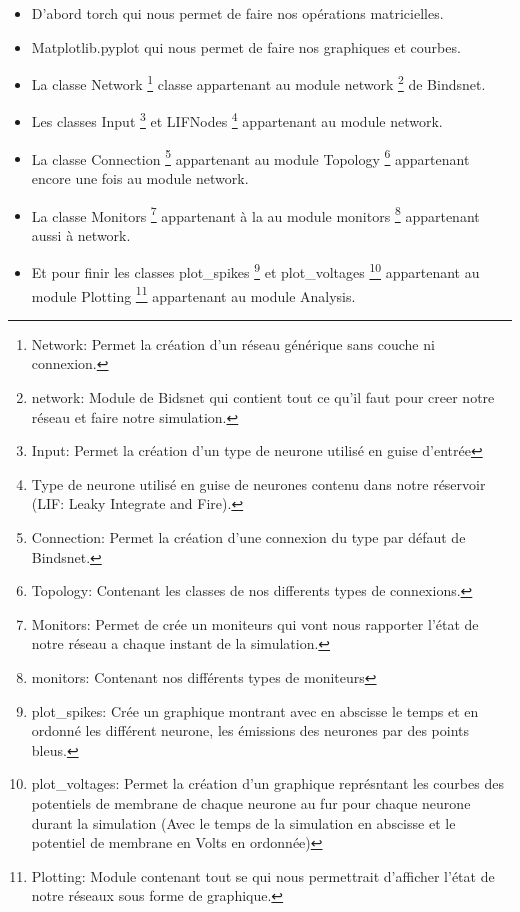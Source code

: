 \begin{itemize}

\item D'abord torch qui nous permet de faire nos opérations matricielles.\\

\item Matplotlib.pyplot qui nous permet de faire nos graphiques et courbes.\\

\item La classe Network \footnote{Network: Permet la création d'un réseau générique sans couche ni connexion.} classe appartenant au module network \footnote{network: Module de Bidsnet qui contient tout ce qu'il faut pour creer notre réseau et faire notre simulation.} de Bindsnet.\\

\item Les classes Input \footnote{Input: Permet la création d'un type de neurone utilisé en guise d'entrée} et LIFNodes \footnote{Type de neurone utilisé en guise de neurones contenu dans notre réservoir (LIF: Leaky Integrate and Fire).} appartenant au module network.\\

\item La classe Connection \footnote{Connection: Permet la création d'une connexion du type par défaut de Bindsnet.} appartenant au module Topology \footnote{Topology: Contenant les classes de nos differents types de connexions.} appartenant encore une fois au module network.

\item La classe Monitors \footnote{Monitors: Permet de crée un moniteurs qui vont nous rapporter l'état de notre réseau a chaque instant de la simulation.} appartenant à la au module monitors \footnote{monitors: Contenant nos différents types de moniteurs} appartenant aussi à network.

\item Et pour finir les classes plot\_spikes \footnote{plot\_spikes: Crée un graphique montrant avec en abscisse le temps et en ordonné les différent neurone, les émissions des neurones par des points bleus.} et plot\_voltages \footnote{plot\_voltages: Permet la création d'un graphique représntant les courbes des potentiels de membrane de chaque neurone au fur pour chaque neurone durant la simulation (Avec le temps de la simulation en abscisse et le potentiel de membrane en Volts en ordonnée)} appartenant au module Plotting \footnote{Plotting: Module contenant tout se qui nous permettrait d'afficher l'état de notre réseaux sous forme de graphique.} appartenant au module Analysis.

\end{itemize}

